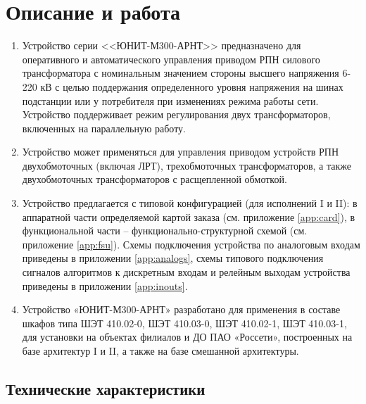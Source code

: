 \color{unimain}\section[Описание и работа]{Описание и работа}
\color{black}

\color{black}

\begin{enumerate}

\item
Устройство серии <<ЮНИТ-М300-АРНТ>> предназначено для оперативного и автоматического управления приводом РПН силового трансформатора с номинальным значением стороны высшего напряжения 6-220 кВ с целью поддержания определенного уровня напряжения на шинах подстанции или у потребителя при изменениях режима работы сети. Устройство поддерживает режим регулирования двух трансформаторов, включенных на параллельную работу.
\item
Устройство может применяться для управления приводом устройств РПН двухобмоточных (включая ЛРТ), трехобмоточных трансформаторов, а также двухобмоточных трансформаторов с расщепленной обмоткой.
\item 
Устройство предлагается с типовой конфигурацией (для исполнений I и II): в аппаратной части определяемой картой заказа (см. приложение \ref{app:card}), в функциональной части -- функционально-структурной схемой (см. приложение \ref{app:fsu}). Схемы подключения устройства по аналоговым входам приведены в приложении \ref{app:analogs}, схемы типового подключения сигналов алгоритмов к дискретным входам и релейным выходам устройства приведены в приложении \ref{app:inouts}.
\item
Устройство «ЮНИТ-М300-АРНТ» разработано для применения в составе шкафов типа ШЭТ 410.02-0, ШЭТ 410.03-0, ШЭТ 410.02-1, ШЭТ 410.03-1, для установки на объектах филиалов  и  ДО  ПАО  «Россети», построенных на базе архитектур I и II, а также на базе смешанной архитектуры.

\end{enumerate}


\color{unimain}\subsection{Технические характеристики}
\color{black}

